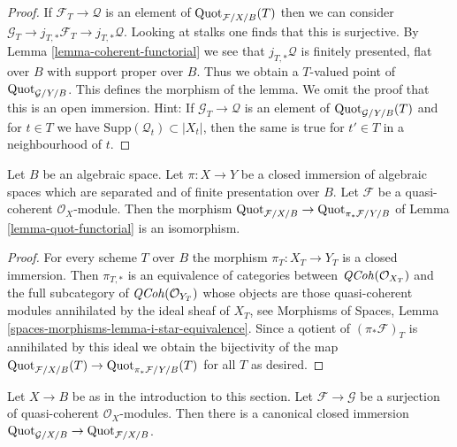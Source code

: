 \begin{proof}
If $\mathcal{F}_T \to \mathcal{Q}$ is an element of
$\mathrm{Quot}_{\mathcal{F}/X/B}(T)$ then we can consider
$\mathcal{G}_T \to j_{T, *}\mathcal{F}_T \to j_{T, *}\mathcal{Q}$.
Looking at stalks one finds that this is surjective.
By Lemma \ref{lemma-coherent-functorial}
we see that $j_{T, *}\mathcal{Q}$ is finitely presented, flat over $B$
with support proper over $B$. Thus we obtain a $T$-valued
point of $\mathrm{Quot}_{\mathcal{G}/Y/B}$.
This defines the morphism of the lemma.
We omit the proof that this is an open immersion. Hint:
If $\mathcal{G}_T \to \mathcal{Q}$ is an element of
$\mathrm{Quot}_{\mathcal{G}/Y/B}(T)$
and for $t \in T$ we have $\text{Supp}(\mathcal{Q}_t) \subset |X_t|$,
then the same is true for $t' \in T$ in a neighbourhood of $t$.
\end{proof}

\begin{lemma}
\label{lemma-quot-closed}
Let $B$ be an algebraic space. Let $\pi : X \to Y$ be a closed immersion
of algebraic spaces which are separated and of finite presentation over $B$.
Let $\mathcal{F}$ be a quasi-coherent $\mathcal{O}_X$-module.
Then the morphism
$\mathrm{Quot}_{\mathcal{F}/X/B} \to \mathrm{Quot}_{\pi_*\mathcal{F}/Y/B}$ of
Lemma \ref{lemma-quot-functorial} is an isomorphism.
\end{lemma}

\begin{proof}
For every scheme $T$ over $B$ the morphism $\pi_T : X_T \to Y_T$
is a closed immersion. Then $\pi_{T, *}$ is an equivalence of
categories between $\mathit{QCoh}(\mathcal{O}_{X_T})$ and the full subcategory
of $\mathit{QCoh}(\mathcal{O}_{Y_T})$ whose objects are those quasi-coherent
modules annihilated by the ideal sheaf of $X_T$, see
Morphisms of Spaces, Lemma \ref{spaces-morphisms-lemma-i-star-equivalence}.
Since a qotient of
$(\pi_*\mathcal{F})_T$ is annihilated by this ideal we obtain the
bijectivity of the map
$\mathrm{Quot}_{\mathcal{F}/X/B}(T) \to \mathrm{Quot}_{\pi_*\mathcal{F}/Y/B}(T)$
for all $T$ as desired.
\end{proof}

\begin{lemma}
\label{lemma-quot-quotient}
Let $X \to B$ be as in the introduction to this section. Let
$\mathcal{F} \to \mathcal{G}$ be a surjection of quasi-coherent
$\mathcal{O}_X$-modules. Then there is a canonical closed immersion
$\mathrm{Quot}_{\mathcal{G}/X/B} \to \mathrm{Quot}_{\mathcal{F}/X/B}$.
\end{lemma}

